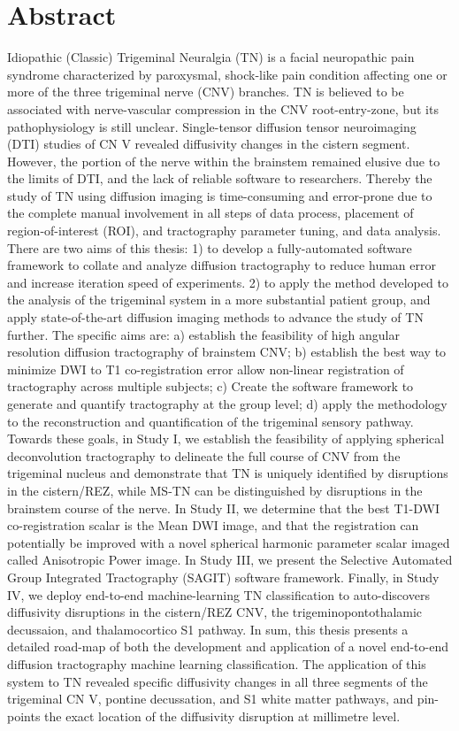 \chapter{Abstract}

Idiopathic (Classic) Trigeminal Neuralgia (TN) is a facial neuropathic pain syndrome characterized by paroxysmal, shock-like pain condition affecting one or more of the three trigeminal nerve (CNV) branches. TN is believed to be associated with nerve-vascular compression in the CNV root-entry-zone, but its pathophysiology is still unclear. Single-tensor diffusion tensor neuroimaging (DTI) studies of CN V revealed diffusivity changes in the cistern segment. However, the portion of the nerve within the brainstem remained elusive due to the limits of DTI, and the lack of reliable software to researchers. Thereby the study of TN using diffusion imaging is time-consuming and error-prone due to the complete manual involvement in all steps of data process, placement of region-of-interest (ROI), and tractography parameter tuning, and data analysis. 
There are two aims of this thesis: 1) to develop a fully-automated software framework to collate and analyze diffusion tractography to reduce human error and increase iteration speed of experiments. 2) to apply the method developed to the analysis of the trigeminal system in a more substantial patient group, and apply state-of-the-art diffusion imaging methods to advance the study of TN further. 
The specific aims are: a) establish the feasibility of high angular resolution diffusion tractography of brainstem CNV; b) establish the best way to minimize DWI to T1 co-registration error allow non-linear registration of tractography across multiple subjects; c) Create the software framework to generate and quantify tractography at the group level; d) apply the methodology to the reconstruction and quantification of the trigeminal sensory pathway. 
Towards these goals, in Study I, we establish the feasibility of applying spherical deconvolution tractography to delineate the full course of CNV from the trigeminal nucleus and demonstrate that TN is uniquely identified by disruptions in the cistern/REZ, while MS-TN can be distinguished by disruptions in the brainstem course of the nerve. In Study II, we determine that the best T1-DWI co-registration scalar is the Mean DWI image, and that the registration can potentially be improved with a novel spherical harmonic parameter scalar imaged called Anisotropic Power image. In Study III, we present the Selective Automated Group Integrated Tractography (SAGIT) software framework. Finally, in Study IV, we deploy end-to-end machine-learning TN classification to auto-discovers diffusivity disruptions in the cistern/REZ CNV, the trigeminopontothalamic decussaion, and thalamocortico S1 pathway. 
In sum, this thesis presents a detailed road-map of both the development and application of a novel end-to-end diffusion tractography machine learning classification. The application of this system to TN revealed specific diffusivity changes in all three segments of the trigeminal CN V, pontine decussation, and S1  white matter pathways, and pin-points the exact location of the diffusivity disruption at millimetre level.